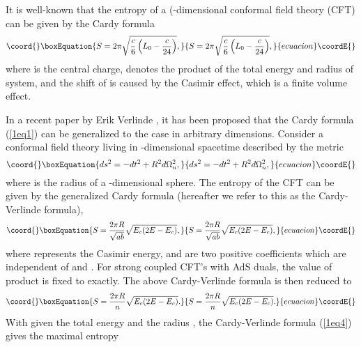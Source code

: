 \documentclass[a4paper,12pt]{article}
\begin{document}
It is well-known that the entropy of a (\coordHE{}-dimensional conformal field 
theory (CFT) can be given by the Cardy formula \cite{Card}
\begin{equation}\coord{}\boxEquation{
\label{1eq1}
S=2\pi \sqrt{\frac{c}{6}\left (L_0-\frac{c}{24}\right )},
}{
S=2\pi \sqrt{\frac{c}{6}\left (L_0-\frac{c}{24}\right )},
}{ecuacion}\coordE{}\end{equation}
where \coordHE{} is the central charge, \coordHE{} denotes the product \coordHE{} of the 
total energy and radius of system, and the shift of \coordHE{} is caused by the
Casimir effect, which is a finite volume effect.

In a recent paper by Erik Verlinde \cite{Verl}, it has been proposed that the
Cardy formula (\ref{1eq1}) can be generalized to the case in arbitrary 
dimensions.  Consider a conformal field theory living in \coordHE{}-dimensional 
spacetime described by the metric
\begin{equation}\coord{}\boxEquation{
\label{1eq2}
ds^2 = -dt^2 +R^2d\Omega_n^2,
}{
ds^2 = -dt^2 +R^2d\Omega_n^2,
}{ecuacion}\coordE{}\end{equation}
where \coordHE{} is the radius of a \coordHE{}-dimensional sphere. The entropy of the CFT
can be given by the generalized Cardy formula (hereafter we refer to this as 
the Cardy-Verlinde formula),
\begin{equation}\coord{}\boxEquation{
\label{1eq3}
S= \frac{2\pi R}{\sqrt{ab}} \sqrt{E_c(2E-E_c)},
}{
S= \frac{2\pi R}{\sqrt{ab}} \sqrt{E_c(2E-E_c)},
}{ecuacion}\coordE{}\end{equation}
where \coordHE{} represents the Casimir energy,  \coordHE{} and \coordHE{} are two positive
coefficients which are independent of \coordHE{} and \coordHE{}. For strong coupled
CFT's with AdS duals, the value of product \coordHE{} is fixed to \coordHE{} exactly.
The above Cardy-Verlinde formula is then reduced to
\begin{equation}\coord{}\boxEquation{
\label{1eq4}
S=\frac{2\pi R}{n}\sqrt{E_c(2E-E_c)}.
}{
S=\frac{2\pi R}{n}\sqrt{E_c(2E-E_c)}.
}{ecuacion}\coordE{}\end{equation}
With given the total energy \coordHE{} and the radius \coordHE{}, the Cardy-Verlinde
formula (\ref{1eq4}) gives the maximal entropy
\end{document}
